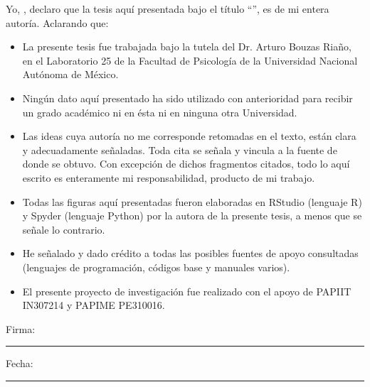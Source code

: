 \documentclass[
12pt, %
spanish, %
singlespacing, %
headsepline, %
]{MastersDoctoralThesis} %
\begin{document}
\begin{declaration}
\addchaptertocentry{\authorshipname} %
\noindent Yo, \authorname, declaro que la tesis aquí presentada bajo el título \enquote{\ttitle}, es de mi entera autoría. Aclarando que:\\

\begin{itemize} 
\item La presente tesis fue trabajada bajo la tutela del Dr. Arturo Bouzas Riaño, en el Laboratorio 25 de la Facultad de Psicología de la Universidad Nacional Autónoma de México.
\item Ningún dato aquí presentado ha sido utilizado con anterioridad para recibir un grado académico ni en ésta ni en ninguna otra Universidad. 
\item Las ideas cuya autoría no me corresponde retomadas en el texto, están clara y adecuadamente señaladas. Toda cita se señala y vincula a la fuente de donde se obtuvo. Con excepción de dichos fragmentos citados, todo lo aquí escrito es enteramente mi responsabilidad, producto de mi trabajo. 
\item Todas las figuras aquí presentadas fueron elaboradas en RStudio (lenguaje R) y Spyder (lenguaje Python) por la autora de la presente tesis, a menos que se señale lo contrario.
\item He señalado y dado crédito a todas las posibles fuentes de apoyo consultadas (lenguajes de programación, códigos base y manuales varios).
\item El presente proyecto de investigación fue realizado con el apoyo de PAPIIT IN307214 y PAPIME PE310016.\\
\end{itemize}
 
\noindent Firma:\\
\rule[0.5em]{25em}{0.5pt} %
 
\noindent Fecha:\\
\rule[0.5em]{25em}{0.5pt} %
\end{declaration}

\cleardoublepage

\end{document}
